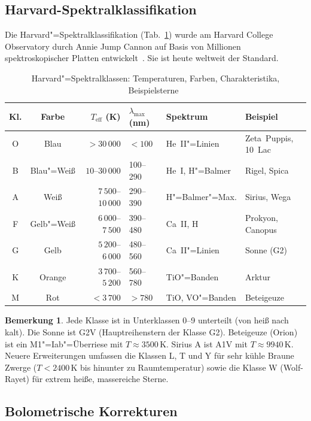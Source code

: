 ﻿\documentclass[a4paper,12pt]{article}
\theoremstyle{definition}
\newtheorem{bemerkung}{Bemerkung}
\begin{document}
\subsection{Harvard-Spektralklassifikation}

Die Harvard"=Spektralklassifikation (Tab.~\ref{tab:spektral}) wurde am
Harvard College Observatory durch Annie Jump Cannon auf Basis
von Millionen spektroskopischer Platten entwickelt~\cite{cannon1901}.
Sie ist heute weltweit der Standard.

\begin{table}[ht]
\centering
\caption{Harvard"=Spektralklassen: Temperaturen, Farben, Charakteristika,
Beispielsterne~\cite{allen2000}}
\label{tab:spektral}
\begin{tabular}{ccrllp{3.5cm}}
\toprule
\textbf{Kl.} & \textbf{Farbe} & \textbf{$T_{\text{eff}}$ (K)} &
\textbf{$\lambda_{\max}$ (nm)} & \textbf{Spektrum} & \textbf{Beispiel} \\
\midrule
O & Blau & $>30\,000$ & $< 100$ & He~II"=Linien & Zeta~Puppis, 10~Lac \\
B & Blau"=Weiß & $10$--$30\,000$ & 100--290 & He~I, H"=Balmer & Rigel, Spica \\
A & Weiß & $7\,500$--$10\,000$ & 290--390 & H"=Balmer"=Max. & Sirius, Wega \\
F & Gelb"=Weiß & $6\,000$--$7\,500$ & 390--480 & Ca~II, H & Prokyon, Canopus \\
G & Gelb & $5\,200$--$6\,000$ & 480--560 & Ca~II"=Linien & Sonne (G2) \\
K & Orange & $3\,700$--$5\,200$ & 560--780 & TiO"=Banden & Arktur \\
M & Rot & $< 3\,700$ & $> 780$ & TiO, VO"=Banden & Beteigeuze \\
\bottomrule
\end{tabular}
\end{table}

\begin{bemerkung}
    Jede Klasse ist in Unterklassen 0--9 unterteilt (von heiß nach kalt).
    Die Sonne ist G2V (Hauptreihenstern der Klasse G2). Beteigeuze
    (Orion) ist ein M1"=Iab"=Überriese mit $T \approx 3500\,\text{K}$.
    Sirius A ist A1V mit $T \approx 9940\,\text{K}$.
    Neuere Erweiterungen umfassen die Klassen L, T und Y für sehr kühle
    Braune Zwerge ($T < 2400\,\text{K}$ bis hinunter zu Raumtemperatur)
    sowie die Klasse W (Wolf-Rayet) für extrem heiße, massereiche Sterne.
\end{bemerkung}

\subsection{Bolometrische Korrekturen}
\end{document}
